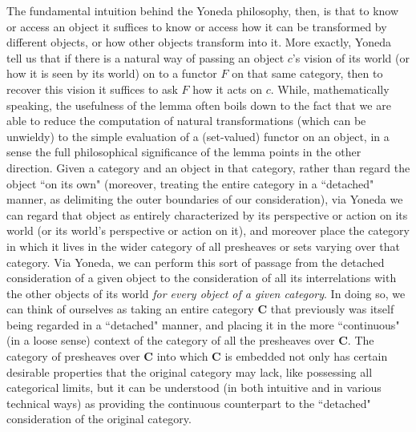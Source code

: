 \documentclass[11pt]{book}
\theoremstyle{definition}
\theoremstyle{definition}
\theoremstyle{definition}
\theoremstyle{theorem}
\theoremstyle{definition}
\begin{document}
  The fundamental intuition behind the Yoneda philosophy, then, is that to know or access an object it suffices to know or access how it can be transformed by different objects, or how other objects transform into it. More exactly, Yoneda tell us that if there is a natural way of passing an object $c$'s vision of its world (or how it is seen by its world) on to a functor $F$ on that same category, then to recover this vision it suffices to ask $F$ how it acts on $c$. While, mathematically speaking, the usefulness of the lemma often boils down to the fact that we are able to reduce the computation of natural transformations (which can be unwieldy) to the simple evaluation of a (set-valued) functor on an object, in a sense the full philosophical significance of the lemma points in the other direction. Given a category and an object in that category, rather than regard the object ``on its own" (moreover, treating the entire category in a ``detached" manner, as delimiting the outer boundaries of our consideration), via Yoneda we can regard that object as entirely characterized by its perspective or action on its world (or its world's perspective or action on it), and moreover place the category in which it lives in the wider category of all presheaves or sets varying over that category. Via Yoneda, we can perform this sort of passage from the detached consideration of a given object to the consideration of all its interrelations with the other objects of its world \textit{for every object of a given category}. In doing so, we can think of ourselves as taking an entire category $\textbf{C}$ that previously was itself being regarded in a ``detached" manner, and placing it in the more ``continuous" (in a loose sense) context of the category of all the presheaves over $\textbf{C}$. The category of presheaves over $\textbf{C}$ into which \textbf{C} is embedded not only has certain desirable properties that the original category may lack, like possessing all categorical limits, but it can be understood (in both intuitive and in various technical ways) as providing the continuous counterpart to the  ``detached" consideration of the original category.
\end{document}
